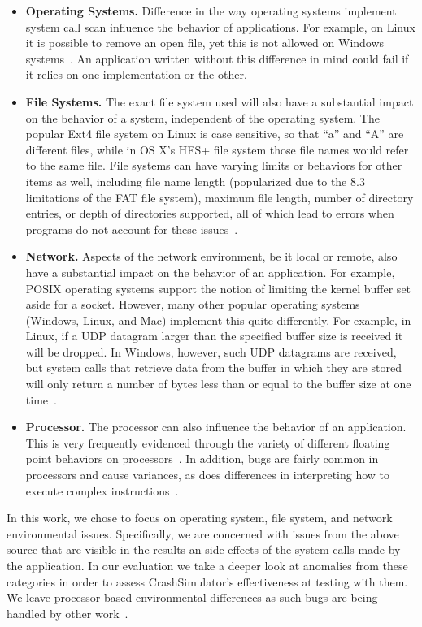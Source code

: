 \begin{itemize}

\item {\bf Operating Systems.} Difference in the way operating systems
implement system call scan influence the behavior of applications.  For
example, on Linux it is possible to remove an open file, yet this is not
allowed on Windows systems~\cite{UnlinkStandard}.  An application
written without this difference in mind could fail if it relies on one
implementation or the other.

\item {\bf File Systems.}  The exact file system used will also have a
substantial impact on the behavior of a system, independent of the
operating system.  The popular Ext4 file system on Linux is case sensitive,
so that ``a'' and ``A'' are different files, while in OS X's HFS+ file system
those file names would refer to the same file.
File systems can have varying limits or behaviors for other items as well,
including file name length (popularized due to the 8.3 limitations of the
FAT file system), maximum file length, number of directory entries, or
depth
of directories supported, all of which lead to errors when programs
do not account for these issues~\cite{EXT4Layout, AppleHFS}.

\item {\bf Network.}  Aspects of the network environment, be it local or
remote, also have a
substantial impact on the behavior of an application.
For example, POSIX operating
systems support the notion of limiting the kernel buffer set aside for a
socket.  However, many other popular operating
systems (Windows, Linux, and Mac)
implement this quite differently.  For example, in Linux, if a UDP datagram
larger than the specified buffer size is received it will be dropped.  In
Windows, however, such
UDP datagrams are
received, but system calls that retrieve data from the buffer in which
they are
stored will only return a number of bytes less than or equal to the
buffer size at one time~\cite{Zhuang_NSDI_2014}.

\item {\bf Processor.}  The processor can also influence the
behavior of an application.  This is very frequently
evidenced through the variety of different floating point behaviors on
processors~\cite{ArbitraryPrecision}.  In addition, bugs are fairly common
in processors and cause variances, as does differences in interpreting
how to execute complex instructions~\cite{Microarch}.

\end{itemize}

In this work, we chose to focus on operating system,
file system, and network
environmental issues.
Specifically, we are concerned with issues from the above source that are
visible in the results an side effects of the system calls made by the
application.  In our evaluation we take a deeper look at anomalies from
these categories in order to assess CrashSimulator's effectiveness
at testing with them.
We leave processor-based environmental differences as such
bugs are being handled by other
work~\cite{Alglave:2018:FSC:3173162.3177156}.
